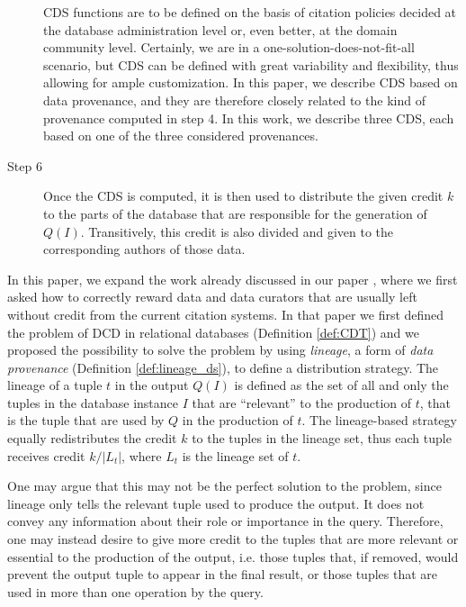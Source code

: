 \begin{description}
	CDS functions are to be defined on the basis of citation policies decided at the database administration level or, even better, at the domain community level. 
	Certainly, we are in a one-solution-does-not-fit-all scenario, but CDS can be defined with great variability and flexibility, thus allowing for ample customization. 
	In this paper, we describe CDS based on data provenance, and they are therefore closely related to the kind of provenance computed in step 4. In this work, we describe three CDS, each based on one of the three considered provenances.
	\item[Step 6] Once the CDS is computed, it is then used to distribute the given credit $k$ to the parts of the database that are responsible for the generation of $Q(I)$. Transitively, this credit is also divided and given to the corresponding authors of those data.
\end{description}

In this paper, we expand the work already discussed in our paper \citep{dosso2020data}, where we first asked how to correctly reward data and data curators that are usually left without credit from the current citation systems.
In that paper we first defined the problem of DCD in relational databases (Definition \ref{def:CDT}) and we proposed the possibility to solve the problem by using \emph{lineage}, a form of \emph{data provenance} (Definition \ref{def:lineage_ds}), to define a distribution strategy.
The lineage of a tuple $t$ in the output $Q(I)$ is defined as the set of all and only the tuples in the database instance $I$ that are ``relevant'' to the production of $t$, that is the tuple that are used by $Q$ in the production of $t$. 
The lineage-based strategy equally redistributes the credit $k$ to the tuples in the lineage set, thus each tuple receives credit $k/|L_t|$, where $L_t$ is the lineage set of $t$. 

One may argue that this may not be the perfect solution to the problem, since lineage only tells the relevant tuple used to produce the output. It does not convey any information about their role or importance in the query.
Therefore, one may instead desire to give more credit to the tuples that are more relevant or essential to the production of the output, i.e. those tuples that, if removed, would prevent the output tuple to appear in the final result, or those tuples that are used in more than one operation by the query. 

